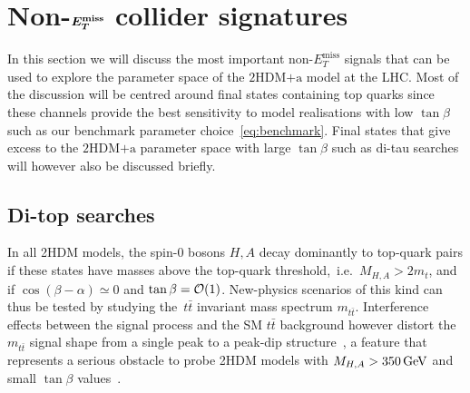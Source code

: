 \documentclass[a4paper, 11pt,notoc]{article}
\newcommand{\MET}{\ensuremath{E_T^\mathrm{miss}}\xspace}
\newcommand{\hdma}{\ensuremath{\textrm{2HDM+a}}\xspace}
\def\bm#1{\mbox{\boldmath$#1$\unboldmath}}
\begin{document}

\section{Non-$\bm{E_T^{\rm miss}}$ collider signatures}
\label{sec:nonMET}

In this section we will discuss the most important non-$\MET$ signals that can be used to explore the parameter space of the \hdma model at the LHC. Most of the discussion will be centred around final states containing top quarks since these channels provide the best sensitivity to model realisations with low $\tan \beta$ such as our benchmark parameter choice~\eqref{eq:benchmark}. Final states that give excess to the \hdma parameter space with large $\tan \beta$ such as di-tau searches will however also be discussed briefly. 

\subsection{Di-top  searches}
\label{sec:ttbarresonances}

{\color{blue} In all 2HDM models, the spin-0 bosons $H,A$  decay dominantly to top-quark pairs if these states have masses above the top-quark threshold,~i.e.~$M_{H, A} > 2 m_t$, and if $\cos (\beta - \alpha) \simeq 0$ and $\tan \beta = {\cal O}(1)$.} New-physics scenarios of this kind can thus be tested by studying the~$t \bar t$ invariant mass spectrum $m_{t \bar t}$.  Interference effects between the signal process and the SM  $t \bar t$ background however distort the $m_{t \bar t}$ signal shape from a single peak to a peak-dip structure~\cite{Gaemers:1984sj,Dicus:1994bm,Bernreuther:1997gs,Frederix:2007gi,Hespel:2016qaf}, a feature that represents a serious obstacle to probe 2HDM models with $M_{H,A} > 350 \, {\rm GeV}$ and small $\tan \beta$ values~\cite{Craig:2015jba,Hajer:2015gka,Gori:2016zto,Carena:2016npr}. 
\end{document}
